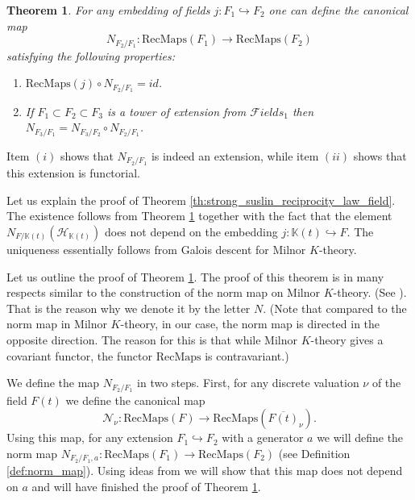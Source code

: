 \documentclass[12pt]{extarticle}
\newtheorem{theorem}{Theorem}[section]
\def\mb{\mathbb}
\def\mc{\mathcal}
\def\k{\mb K}
\def\N{\mc N}
\def\emb{\hookrightarrow}
\def\F{{\mc Fields}}
\newcommand{\SRL}{\mathrm{RecMaps}}
\begin{document}
\begin{theorem}
\label{th:norm_map}For any embedding of fields $j\colon F_1\emb F_2$ one can define the canonical map $$N_{F_2/F_1}\colon \SRL(F_1)\to \SRL(F_2)$$ satisfying the following properties:
\begin{enumerate}
\item $\SRL(j)\circ N_{F_2/F_1}=id$. \item If $F_1\subset F_2\subset F_3$ is a tower of extension from $\F_1$ then $N_{F_3/F_1}=N_{F_3/F_2}\circ N_{F_2/F_1}$.
\end{enumerate}
\end{theorem}

Item $(i)$ shows that $N_{F_2/F_1}$ is indeed an extension, while item $(ii)$ shows that this extension is functorial.

Let us explain the proof of Theorem \ref{th:strong_suslin_reciprocity_law_field}. The existence follows from Theorem \ref{th:norm_map} together with the fact that the element $N_{F/\k(t)}(\mathcal H_{\k(t)})$ does not depend on the embedding $j\colon \k(t)\emb F$. The uniqueness essentially follows from Galois descent for Milnor $K$-theory. %

Let us outline the proof of Theorem \ref{th:norm_map}. The proof of this theorem is in many respects similar to the construction of the norm map on Milnor $K$-theory. (See \cite{bass1973milnor,suslin1979reciprocity,MILNOR1969/70, kato1980generalization}). That is the reason why we denote it by the letter $N$. (Note that compared to the norm map in Milnor $K$-theory, in our case, the norm map is directed in the opposite direction. The reason for this is that while Milnor $K$-theory gives a covariant functor, the functor $\SRL$ is contravariant.) 

We define the map $N_{F_2/F_1}$ in two steps. First, for any discrete valuation $\nu$ of the field $F(t)$ we define the canonical map
$$\N_\nu\colon \SRL(F)\to \SRL(\overline {F(t)}_\nu).$$
Using this map, for any extension $F_1\emb F_2$ with a generator $a$ we will define the norm map $N_{F_2/F_1, a}\colon \SRL(F_1)\to \SRL(F_2)$ (see Definition \ref{def:norm_map}). Using ideas from \cite{suslin1979reciprocity} we will show that this map does not depend on $a$ and will have finished the proof of Theorem \ref{th:norm_map}. 
\end{document}
